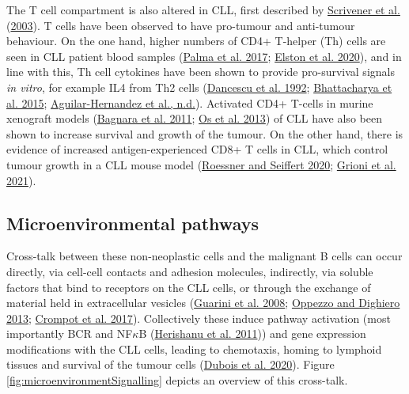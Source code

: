 \documentclass[11pt, a4paper, twosided]{book}
\begin{document}
The T cell compartment is also altered in CLL, first described by \protect\hyperlink{ref-Scrivener2003}{Scrivener et al.} (\protect\hyperlink{ref-Scrivener2003}{2003}). T cells have been observed to have pro-tumour and anti-tumour behaviour. On the one hand, higher numbers of CD4+ T-helper (Th) cells are seen in CLL patient blood samples (\protect\hyperlink{ref-Palma2017}{Palma et al. 2017}; \protect\hyperlink{ref-Elston2020}{Elston et al. 2020}), and in line with this, Th cell cytokines have been shown to provide pro-survival signals \emph{in vitro}, for example IL4 from Th2 cells (\protect\hyperlink{ref-Dancescu1992}{Dancescu et al. 1992}; \protect\hyperlink{ref-Bhattacharya2015}{Bhattacharya et al. 2015}; \protect\hyperlink{ref-AguilarHernandez2016}{Aguilar-Hernandez et al., n.d.}). Activated CD4+ T-cells in murine xenograft models (\protect\hyperlink{ref-Bagnara2011}{Bagnara et al. 2011}; \protect\hyperlink{ref-Os2013}{Os et al. 2013}) of CLL have also been shown to increase survival and growth of the tumour. On the other hand, there is evidence of increased antigen-experienced CD8+ T cells in CLL, which control tumour growth in a CLL mouse model (\protect\hyperlink{ref-Roessner2020}{Roessner and Seiffert 2020}; \protect\hyperlink{ref-Grioni2021}{Grioni et al. 2021}).

\hypertarget{intro-microenvironmental-pathways}{%
\subsection{Microenvironmental pathways}\label{intro-microenvironmental-pathways}}

Cross-talk between these non-neoplastic cells and the malignant B cells can occur directly, via cell-cell contacts and adhesion molecules, indirectly, via soluble factors that bind to receptors on the CLL cells, or through the exchange of material held in extracellular vesicles (\protect\hyperlink{ref-Guarini2008}{Guarini et al. 2008}; \protect\hyperlink{ref-Oppezzo2013}{Oppezzo and Dighiero 2013}; \protect\hyperlink{ref-Crompot2017}{Crompot et al. 2017}). Collectively these induce pathway activation (most importantly BCR and NF\(\kappa\)B (\protect\hyperlink{ref-Herishanu2011}{Herishanu et al. 2011})) and gene expression modifications with the CLL cells, leading to chemotaxis, homing to lymphoid tissues and survival of the tumour cells (\protect\hyperlink{ref-Dubois2020}{Dubois et al. 2020}). Figure \ref{fig:microenvironmentSignalling} depicts an overview of this cross-talk.
\end{document}
